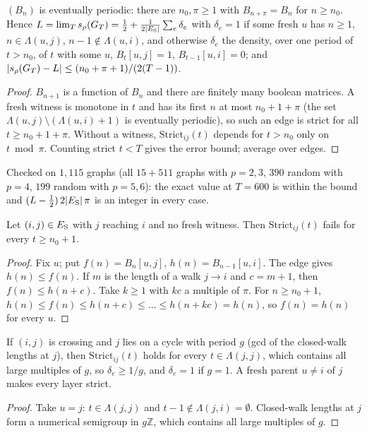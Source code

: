 \begin{proposition}\label{prop:noloopperiod}
$(B_n)$ is eventually periodic: there are $n_0,\pi\ge1$ with $B_{n+\pi}=B_n$
for $n\ge n_0$. Hence $L=\lim_Ts_\rho(G_T)=\tfrac12+\frac1{2|E_{\mathrm S}|}\sum_e\delta_e$
with $\delta_e=1$ if some fresh $u$ has $n\ge1$, $n\in\Lambda(u,j)$,
$n-1\notin\Lambda(u,i)$, and otherwise $\delta_e$ the density, over one period
of $t>n_0$, of $t$ with some $u$, $B_t[u,j]=1$, $B_{t-1}[u,i]=0$; and
$|s_\rho(G_T)-L|\le(n_0+\pi+1)/(2(T-1))$.
\end{proposition}
\begin{proof}
$B_{n+1}$ is a function of $B_n$ and there are finitely many boolean matrices.
A fresh witness is monotone in $t$ and has its first $n$ at most $n_0+1+\pi$
(the set $\Lambda(u,j)\setminus(\Lambda(u,i)+1)$ is eventually periodic), so
such an edge is strict for all $t\ge n_0+1+\pi$. Without a witness,
$\mathrm{Strict}_{ij}(t)$ depends for $t>n_0$ only on $t\bmod\pi$. Counting
strict $t<T$ gives the error bound; average over edges.
\end{proof}
Checked on $1{,}115$ graphs (all $15+511$ graphs with $p=2,3$, $390$ random with
$p=4$, $199$ random with $p=5,6$): the exact value at $T=600$ is within the
bound and $(L-\tfrac12)\,2|E_{\mathrm S}|\,\pi$ is an integer in every case.

\begin{proposition}\label{prop:noloopscc}
Let $(i,j)\in E_{\mathrm S}$ with $j$ reaching $i$ and no fresh witness. Then
$\mathrm{Strict}_{ij}(t)$ fails for every $t\ge n_0+1$.
\end{proposition}
\begin{proof}
Fix $u$; put $f(n)=B_n[u,j]$, $h(n)=B_{n-1}[u,i]$. The edge gives $h(n)\le f(n)$.
If $m$ is the length of a walk $j\to i$ and $c=m+1$, then $f(n)\le h(n+c)$. Take
$k\ge1$ with $kc$ a multiple of $\pi$. For $n\ge n_0+1$,
$h(n)\le f(n)\le h(n+c)\le\dots\le h(n+kc)=h(n)$, so $f(n)=h(n)$ for every $u$.
\end{proof}

\begin{proposition}\label{prop:noloopcross}
If $(i,j)$ is crossing and $j$ lies on a cycle with period $g$ (gcd of the
closed-walk lengths at $j$), then $\mathrm{Strict}_{ij}(t)$ holds for every
$t\in\Lambda(j,j)$, which contains all large multiples of $g$, so
$\delta_e\ge1/g$, and $\delta_e=1$ if $g=1$. A fresh parent $u\ne i$ of $j$ makes
every layer strict.
\end{proposition}
\begin{proof}
Take $u=j$: $t\in\Lambda(j,j)$ and $t-1\notin\Lambda(j,i)=\emptyset$. Closed-walk
lengths at $j$ form a numerical semigroup in $g\mathbb Z$, which contains all
large multiples of $g$.
\end{proof}

